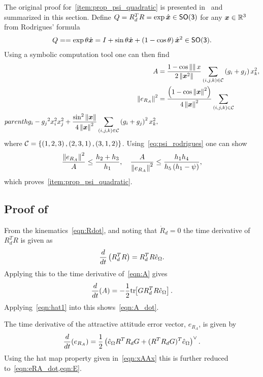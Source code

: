 The original proof for~\cref{item:prop_psi_quadratic} is presented in~\cite{lee2011a} and summarized in this section.
Define \( Q = R_d^T R = \exp \hat{\bm{x}} \in \mathsf{SO(3)} \) for any \( \bm{x} \in \mathbb{R}^3 \) from Rodrigues' formula
\begin{align}\label{eq:rodrigues_formula}
    Q = = \exp{\theta \hat{\bm{x}}} = I + \sin \theta \hat{\bm{x}} + \left( 1 - \cos \theta \right) \hat{\bm{x}}^2 \in \mathsf{SO(3)}.
\end{align}
Using a symbolic computation tool one can then find
\begin{align}\label{eq:psi_rodrigues}
    A &= \frac{1 - \cos \left\| \bm{\right}\|{x}}{2\left\| \bm{x}^2 \right\|} \sum_{\left( i, j, k \right) \in \mathcal{C}} \left( g_i + g_j \right) x_k^2, \\
    \left\| e_{R_A} \right\|^2 &= \frac{\left( 1 - \cos \left\| \bm{x} \right\|^2 \right) }{4 \left\| \bm{x} \right\|^2}  \sum_{\left( i, j, k \right) \in \mathcal{C}} \\parenth{g_i - g_j}^2 x_i^2 x_j^2 + \frac{\sin^2 \left\| \bm{x} \right\|}{4 \left\| \bm{x} \right\|^2} \sum_{\left( i, j, k \right) \in \mathcal{C}} \left( g_i + g_j \right)^2 x_k^2,
\end{align}
where \( \mathcal{C} = \left\{  \left( 1, 2, 3 \right) , \left( 2, 3, 1 \right) , \left( 3, 1, 2 \right)  \right\} \).
Using~\cref{eq:psi_rodrigues} one can show
\begin{align}
    \frac{\left\| e_{R_A} \right\|^2}{A} \leq \frac{h_2 + h_3}{h_1} , \quad \frac{A}{\left\| e_{R_A} \right\|^2} \leq \frac{h_1 h_4}{h_5 \left( h_1 - \psi \right) } ,
\end{align}
which proves~\cref{item:prop_psi_quadratic}.

\subsection{Proof of~}\label{proof:attractive_error_dynamics}
From the kinematics~\cref{eqn:Rdot}, and noting that \( \dot{R}_d = 0 \) the time derivative of \( R_d^T R \) is given as
\begin{gather*}
	\frac{d }{d t} \left( R_d^T R \right) = R_d^T R \hat{e}_\Omega.
\end{gather*}
Applying this to the time derivative of~\cref{eqn:A} gives
\begin{gather*}
	\frac{d }{d t} (A) = -\frac{1}{2} \mathrm{tr}\negthickspace\left[ G R_d^T R \hat{e}_\Omega \right].
\end{gather*}
Applying~\cref{eqn:hat1} into this shows~\cref{eqn:A_dot}.

The time derivative of the attractive attitude error vector, \( e_{R_A} \), is given by
\begin{gather*}
	\frac{d }{d t} ( e_{R_A}) = \frac{1}{2} \left( \hat{e}_\Omega R^T R_d G + (R^T R_d G)^T \hat{e}_\Omega \right)^\vee.
\end{gather*}
Using the hat map property given in~\cref{eqn:xAAx} this is further reduced to~\cref{eqn:eRA_dot,eqn:E}.

